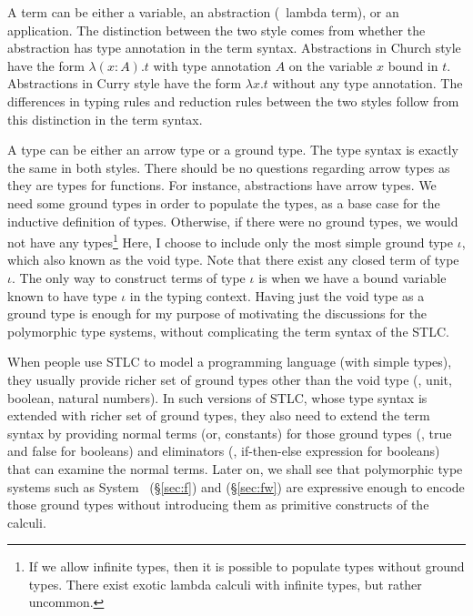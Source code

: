 A term can be either a variable, an abstraction (\aka\ lambda term), or
an application. The distinction between the two style comes from whether
the abstraction has type annotation in the term syntax. Abstractions in
Church style have the form $\lambda(x:A).t$ with type annotation $A$ on
the variable $x$ bound in $t$. Abstractions in Curry style have the form
$\lambda x.t$ without any type annotation. The differences in typing rules
and reduction rules between the two styles follow from this distinction
in the term syntax.

A type can be either an arrow type or a ground type.
The type syntax is exactly the same in both styles.
There should be no questions regarding arrow types as they are types for
functions. For instance, abstractions have arrow types. We need some
ground types in order to populate the types, as a base case for
the inductive definition of types. Otherwise, if there were no ground types,
we would not have any types\footnote{If we allow infinite types, then it is
	possible to populate types without ground types. There exist exotic
	lambda calculi with infinite types, but rather uncommon.}
Here, I choose to include only the most simple ground type $\iota$,
which also known as the void type. Note that there exist any closed term of
type $\iota$. The only way to construct terms of type $\iota$ is when we
have a bound variable known to have type $\iota$ in the typing context.
Having just the void type as a ground type is enough for my purpose of
motivating the discussions for the polymorphic type systems, without
complicating the term syntax of the STLC.

When people use STLC to model a programming language (with simple types),
they usually provide richer set of ground types other than the void type
(\eg, unit, boolean, natural numbers). In such versions of STLC, whose
type syntax is extended with richer set of ground types, they also need to
extend the term syntax by providing normal terms (or, constants) for
those ground types (\eg, \textsf{true} and \textsf{false} for booleans) and
eliminators (\eg, if-then-else expression for booleans) that can examine
the normal terms. Later on, we shall see that polymorphic type systems
such as System \F\ (\S\ref{sec:f}) and \Fw (\S\ref{sec:fw}) are expressive
enough to encode those ground types without introducing them as primitive
constructs of the calculi.

